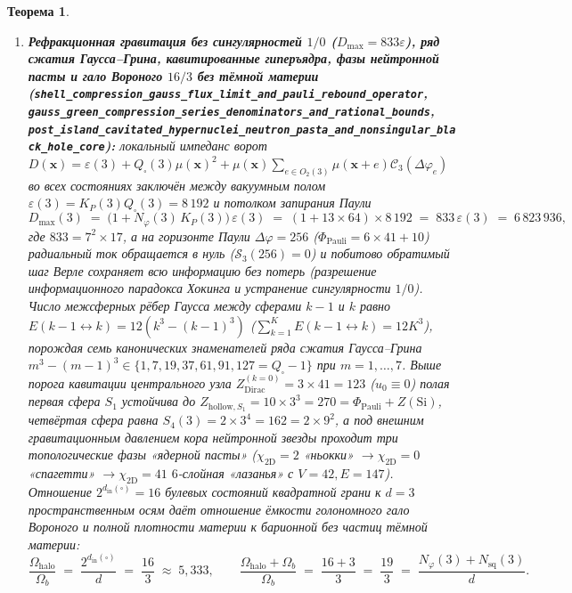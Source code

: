\documentclass[11pt,a4paper]{article}
\theoremstyle{plain}
\newtheorem{theorem}{Теорема}[section]
\theoremstyle{definition}
\begin{document}
\begin{theorem}
\begin{enumerate}[label=\textbf{(\arabic*)},leftmargin=*]
\item \textbf{Рефракционная гравитация без сингулярностей $1/0$ ($D_{\max} = 833\varepsilon$), ряд сжатия Гаусса--Грина, кавитированные гиперъядра, фазы нейтронной пасты и гало Вороного $16/3$ без тёмной материи (\texttt{shell\_compression\_gauss\_flux\_limit\_and\_pauli\_rebound\_operator}, \texttt{gauss\_green\_compression\_series\_denominators\_and\_rational\_bounds}, \texttt{post\_island\_cavitated\_hypernuclei\_neutron\_pasta\_and\_nonsingular\_black\_hole\_core}):}
  локальный импеданс ворот $D(\mathbf{x}) = \varepsilon(3) + Q_\square(3)\mu(\mathbf{x})^2 + \mu(\mathbf{x})\sum_{e\in O_2(3)}\mu(\mathbf{x}+e)\mathcal{C}_3(\Delta\varphi_e)$ во всех состояниях заключён между вакуумным полом $\varepsilon(3) = K_P(3) Q_\square(3) = 8\,192$ и потолком запирания Паули
  \begin{equation}
    \label{eq:pauli-stasis-ceiling-833}
    D_{\max}(3) \;=\; \bigl(1 + N_\varphi(3)\,K_P(3)\bigr)\,\varepsilon(3) \;=\; (1 + 13\times 64)\times 8\,192 \;=\; 833\,\varepsilon(3) \;=\; 6\,823\,936,
  \end{equation}
  где $833 = 7^2\times 17$, а на горизонте Паули $\Delta\varphi = 256$ ($\Phi_{\mathrm{Pauli}} = 6\times 41 + 10$) радиальный ток обращается в нуль ($\mathcal{S}_3(256) = 0$) и побитово обратимый шаг Верле сохраняет всю информацию без потерь (разрешение информационного парадокса Хокинга и устранение сингулярности $1/0$). Число межсферных рёбер Гаусса между сферами $k-1$ и $k$ равно $E(k-1\leftrightarrow k) = 12(k^3 - (k-1)^3)$ ($\sum_{k=1}^K E(k-1\leftrightarrow k) = 12 K^3$), порождая семь канонических знаменателей ряда сжатия Гаусса--Грина $m^3 - (m-1)^3 \in \{1, 7, 19, 37, 61, 91, 127 = Q_\square - 1\}$ при $m = 1,\dots,7$. Выше порога кавитации центрального узла $Z_{\mathrm{Dirac}}^{(k=0)} = 3\times 41 = 123$ ($u_0 \equiv 0$) полая первая сфера $S_1$ устойчива до $Z_{\mathrm{hollow},S_1} = 10\times 3^3 = 270 = \Phi_{\mathrm{Pauli}} + Z(\mathrm{Si})$, четвёртая сфера равна $S_4(3) = 2\times 3^4 = 162 = 2\times 9^2$, а под внешним гравитационным давлением кора нейтронной звезды проходит три топологические фазы «ядерной пасты» ($\chi_{\mathrm{2D}} = 2$ «ньокки» $\to \chi_{\mathrm{2D}} = 0$ «спагетти» $\to \chi_{\mathrm{2D}} = 41$ $6$-слойная «лазанья» с $V = 42, E = 147$). Отношение $2^{d_{\mathrm{in}}(\square)} = 16$ булевых состояний квадратной грани к $d = 3$ пространственным осям даёт отношение ёмкости голономного гало Вороного и полной плотности материи к барионной без частиц тёмной материи:
  \begin{equation}
    \label{eq:voronoi-halo-16-3}
    \frac{\Omega_{\mathrm{halo}}}{\Omega_b} \;=\; \frac{2^{d_{\mathrm{in}}(\square)}}{d} \;=\; \frac{16}{3} \;\approx\; 5{,}333, \qquad
    \frac{\Omega_{\mathrm{halo}} + \Omega_b}{\Omega_b} \;=\; \frac{16 + 3}{3} \;=\; \frac{19}{3} \;=\; \frac{N_\varphi(3) + N_{\mathrm{sq}}(3)}{d}.
  \end{equation}


\end{enumerate}
\end{theorem}
\end{document}
